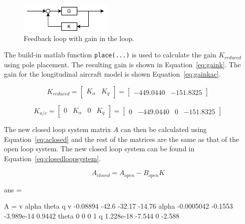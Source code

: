 \begin{figure}[ht]
    \centering
    \includegraphics[width=0.4\textwidth]{figures/pc_loop1.pdf}    
    \caption{Feedback loop with gain in the loop.}
    \label{fig:pc_loop1}
\end{figure}

The build-in matlab function \texttt{place(...)} is used to calculate the gain $K_{reduced}$ using pole placement. The resulting gain is shown in Equation~\ref{eq:gaink}. The gain for the longitudinal aircraft model is shown Equation~\ref{eq:gainkac}.

\begin{equation}
    \label{eq:gaink}
    K_{reduced}=\begin{bmatrix}
                    K_{\alpha} & K_q
                \end{bmatrix}
               =\begin{bmatrix}
                    -449.0440 & -151.8325
                \end{bmatrix}
\end{equation}

\begin{equation}
    \label{eq:gainkac}
    K_{a/c}=\begin{bmatrix}
                    0 & K_{\alpha} & 0 & K_q
                \end{bmatrix}
               =\begin{bmatrix}
                    0 & -449.0440 & 0 & -151.8325
                \end{bmatrix}
\end{equation}

The new closed loop system matrix $A$ can then be calculated using Equation~\ref{eq:aclosed} and the rest of the matrices are the same as that of the open loop system. The new closed loop system can be found in Equation~\ref{eq:closedloopsystem}.

\begin{equation}
    \label{eq:aclosed}
    A_{closed} = A_{open}-B_{open}K
\end{equation}


ans =
 
  A = 
                   v       alpha       theta           q
   v        -0.08894       -42.6      -32.17      -14.76
   alpha  -0.0005042     -0.1553  -3.989e-14      0.9442
   theta           0           0           0           1
   q       1.228e-18      -7.544           0      -2.588
 
